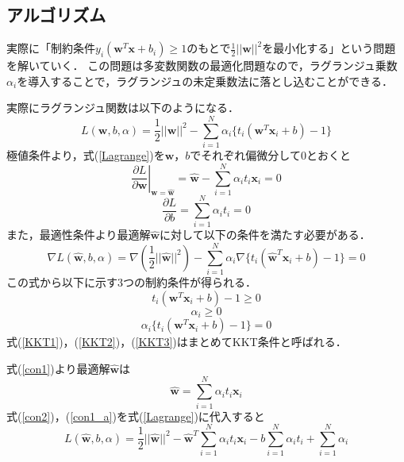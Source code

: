\subsection*{アルゴリズム}
実際に「制約条件$y_i(\bm{w}^T\bm{x}+b_i) \geq 1$のもとで$\frac{1}{2}||\bm{w}||^2$を最小化する」という問題を解いていく．
この問題は多変数関数の最適化問題なので，ラグランジュ乗数$\alpha_i$を導入することで，ラグランジュの未定乗数法に落とし込むことができる．\par
実際にラグランジュ関数は以下のようになる．
\begin{equation}
    L(\bm{w},b,\alpha)=\frac{1}{2}||\bm{w}||^2-\sum_{i=1}^{N}\alpha_i\{t_i(\bm{w}^T\bm{x}_i+b)-1\}
    \label{Lagrange}
\end{equation}
極値条件より，式(\ref{Lagrange})を$\bm{w}$，$b$でそれぞれ偏微分して0とおくと
\begin{equation}
    \left.\frac{\partial L}{\partial \bm{w}}\right|_{\bm{w}=\hat{\bm{w}}}=\hat{\bm{w}}-\sum_{i=1}^{N}\alpha_it_i\bm{x}_i=0
    \label{con1}
\end{equation}
\begin{equation}
    \frac{\partial L}{\partial b}=\sum_{i=1}^{N}\alpha_it_i=0
    \label{con2}
\end{equation}
また，最適性条件より最適解$\hat{\bm{w}}$に対して以下の条件を満たす必要がある．
\begin{equation}
    \nabla L(\hat{\bm{w}},b,\alpha)=\nabla(\frac{1}{2}||\hat{\bm{w}}||^2)-\sum_{i=1}^{N}\alpha_i\nabla\{t_i(\hat{\bm{w}}^T\bm{x}_i+b)-1\}=0
\end{equation}
この式から以下に示す3つの制約条件が得られる．
\begin{equation}
    t_i(\bm{w}^T\bm{x}_i+b)-1 \geq 0
    \label{KKT1}
\end{equation}
\begin{equation}
    \alpha_i \geq 0
    \label{KKT2}
\end{equation}
\begin{equation}
    \alpha_i\{t_i(\bm{w}^T\bm{x}_i+b)-1\}=0
    \label{KKT3}
\end{equation}
式(\ref{KKT1})，(\ref{KKT2})，(\ref{KKT3})はまとめてKKT条件と呼ばれる．\par
式(\ref{con1})より最適解$\hat{\bm{w}}$は
\begin{equation}
    \hat{\bm{w}}=\sum_{i=1}^{N}\alpha_it_i\bm{x}_i
    \label{con1_a}
\end{equation}
式(\ref{con2})，(\ref{con1_a})を式(\ref{Lagrange})に代入すると
\begin{equation}
    L(\hat{\bm{w}},b,\alpha)=\frac{1}{2}||\hat{\bm{w}}||^2-\hat{\bm{w}}^T\sum_{i=1}^{N}\alpha_it_i\bm{x}_i-b\sum_{i=1}^{N}\alpha_it_i+\sum_{i=1}^{N}\alpha_i
\end{equation}
